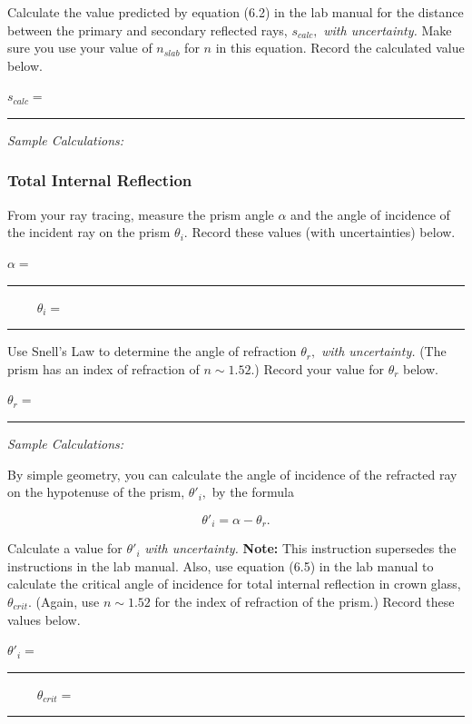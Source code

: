 \noindent
Calculate the value predicted by equation (6.2) in the lab manual for the distance
between the primary and secondary reflected rays, $s_{calc},$ {\it with uncertainty.}
Make sure you use your value of $n_{slab}$ for $n$ in this equation.
Record the calculated value below.

\begin{center}
$s_{calc}=$~ \rule{3cm}{.1mm}
\end{center}

{\it Sample Calculations:}
\newpage

\subsubsection{Total Internal Reflection}

From your ray tracing, measure the prism angle $\alpha$ and the angle of incidence of
the incident ray on the prism $\theta _i.$ Record these values (with uncertainties)
below. 
\begin{center}
$\alpha = $~ \rule{3cm}{.1mm} ~~~~
$\theta _i=$~ \rule{3cm}{.1mm}
\end{center}
\vspace*{.5cm}

\noindent
Use Snell's Law to determine the angle of refraction $\theta _r,$ {\it with
uncertainty.} (The prism has an index of refraction of $n \sim 1.52.$) 
Record your value for $\theta _r$ below.

\begin{center}
$\theta _r=$~ \rule{3cm}{.1mm}
\end{center}
{\it Sample Calculations:}
\vspace*{4cm}

\noindent
By simple geometry, you can calculate the angle of incidence of the refracted ray on
the hypotenuse of the prism, $\theta  '_i,$ by the formula

$$
\theta '_i = \alpha - \theta _r.
$$

\noindent
Calculate a value for $\theta '_i$ {\it with uncertainty.} {\bf Note:} This
instruction supersedes the instructions in the lab manual. Also, use equation (6.5) in
the lab manual to calculate the critical angle of incidence for total internal
reflection in crown glass, $\theta _{crit}.$ (Again, use $n \sim 1.52$ for the index
of refraction of the prism.) Record these values below.

\begin{center}
$\theta '_i=$~ \rule{3cm}{.1mm} ~~~~ 
$\theta _{crit}=$~ \rule{3cm}{.1mm}
\end{center} 

